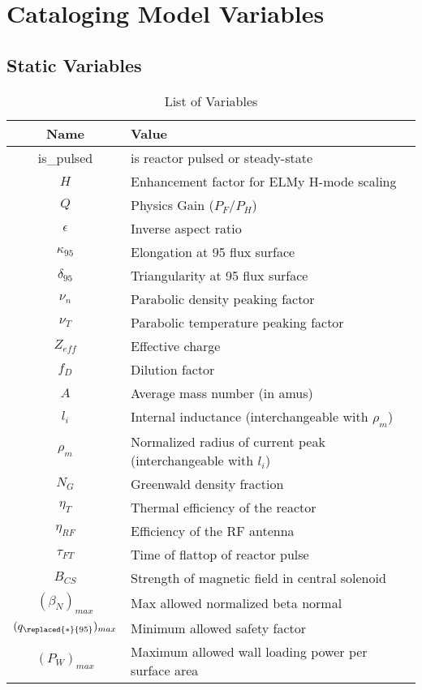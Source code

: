 \chapter{Cataloging Model Variables}

\section{Static Variables}

\label{chapter:var_table}

\begin{table}[h]
\centering
\caption{List of  Variables}
\begin{tabular}{c|l}
\textbf{Name} & \textbf{Value} \\
\hline
is\_pulsed & is reactor pulsed or steady-state \\
$H$ & Enhancement factor for ELMy H-mode scaling \\
$Q$ & Physics Gain ($P_F/P_H$) \\
$\epsilon$ & Inverse aspect ratio \\
$\kappa_{95}$ &  Elongation at 95 flux surface \\
$\delta_{95}$ &  Triangularity at 95 flux surface \\
$\nu_n$ &  Parabolic density peaking factor \\
$\nu_T$ &  Parabolic temperature peaking factor \\
$Z_{eff}$ & Effective charge \\
$f_D$ & Dilution factor \\
$A$ & Average mass number (in amus) \\
$l_i$ & Internal inductance (interchangeable with $\rho_m$) \\
$\rho_m$ & Normalized radius of current peak (interchangeable with $l_i$) \\
$N_G$ & Greenwald density fraction \\
$\eta_T$ & Thermal efficiency of the reactor \\
$\eta_{RF}$ &  Efficiency of the RF antenna \\
$\tau_{FT}$ &  Time of flattop of reactor pulse \\
$B_{CS}$ &  Strength of magnetic field in central solenoid \\
$(\beta_N)_{max}$ &  Max allowed normalized beta normal \\
$(q_{\replaced{*}{95}})_{max}$ & Minimum allowed safety factor \\
$(P_W)_{max}$ & Maximum allowed wall loading power per surface area
\end{tabular}
\end{table}


